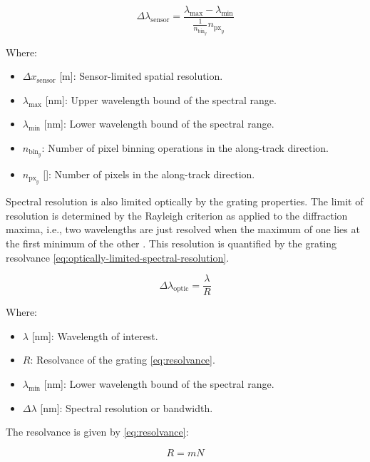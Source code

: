 \documentclass{article}
\begin{document}
\begin{equation} \label{eq:sensor-limited-spectral-resolution}
    \Delta\lambda_{\text{sensor}} = \frac{\lambda_{\text{max}} - \lambda_{\text{min}} }{ \frac{1}{n_{\text{bin}_{y}}} n_{\text{px}_y} }
\end{equation}

Where:
\begin{itemize}[label={}]
    \item $\Delta x_{\text{sensor}}$ [\si{\m}]: Sensor-limited spatial resolution.
    \item $\lambda_{\text{max}}$ [\si{\nm}]: Upper wavelength bound of the spectral range.
    \item $\lambda_{\text{min}}$ [\si{\nm}]: Lower wavelength bound of the spectral range.
    \item $n_{\text{bin}_{y}}$: Number of pixel binning operations in the along-track direction.
    \item $n_{\text{px}_y}$ [\si{\px}]: Number of pixels in the along-track direction.
\end{itemize}


Spectral resolution is also limited optically by the grating properties. The limit of resolution is determined by the Rayleigh criterion as applied to the diffraction maxima, i.e., two wavelengths are just resolved when the maximum of one lies at the first minimum of the other \cite{grating-resolution}. This resolution is quantified by the grating resolvance \eqref{eq:optically-limited-spectral-resolution}.


\begin{equation} \label{eq:optically-limited-spectral-resolution}
    \Delta\lambda_{\text{optic}} = \frac{\lambda}{R}
\end{equation}

Where:
\begin{itemize}[label={}]
    \item $\lambda$ [\si{\nm}]: Wavelength of interest.
    \item $R$: Resolvance of the grating \eqref{eq:resolvance}.
    \item $\lambda_{\text{min}}$ [\si{\nm}]: Lower wavelength bound of the spectral range.
    \item $\Delta\lambda$ [\si{\nm}]: Spectral resolution or bandwidth.
\end{itemize}

The resolvance is given by \ref{eq:resolvance}:

\begin{equation} \label{eq:resolvance}
    R = mN
\end{equation}
\end{document}
